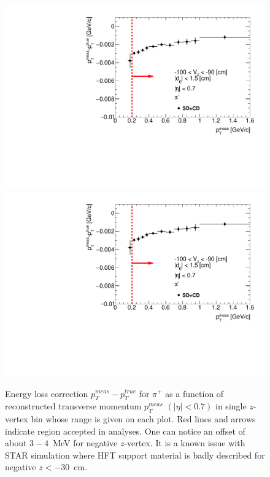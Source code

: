 \begin{figure}[H]
\caption[Energy loss correction for $\pi^+$ as a function of reconstructed transverse momentum $p_T^{meas}$.]{Energy loss correction $p_T^{meas}-p_T^{true}$ for $\pi^+$ as a function of reconstructed transverse momentum $p_T^{meas}$ $\left(|\eta|<0.7\right)$ in single $z$-vertex bin whose range is given on each plot. Red lines and arrows indicate region accepted in analyses. One can notice an offset of about $3-4$~MeV for negative $z$-vertex. It is a known issue with STAR simulation where HFT support material is badly described for negative $z<-30$~cm.}\label{fig:energyLossPrimaryPi_plus}
\parbox{0.329\textwidth}{
  \includegraphics[width=\linewidth,page=63]{graphics/energyLoss/energyLoss3D_OnePrtAlso.pdf}\\
  \includegraphics[width=\linewidth,page=66]{graphics/energyLoss/energyLoss3D_OnePrtAlso.pdf}\\
}
\end{figure}
